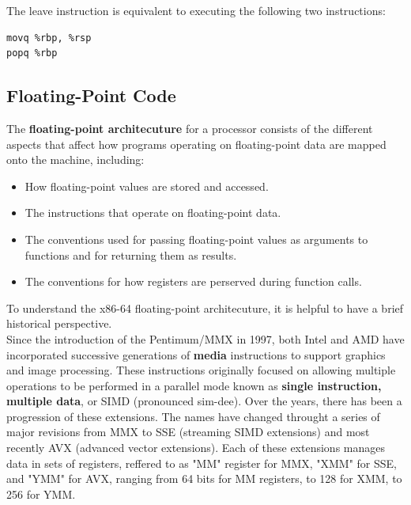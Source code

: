 \documentclass[11pt]{article}
\begin{document}
The leave instruction is equivalent to executing the following two instructions:\\
\begin{verbatim}
movq %rbp, %rsp
popq %rbp
\end{verbatim}

\subsection{Floating-Point Code}
\label{sec:org8b856b1}
The \textbf{floating-point architecuture} for a processor consists of the different aspects that affect how programs operating on floating-point data are mapped onto the machine, including:\\
\begin{itemize}
\item How floating-point values are stored and accessed.\\
\item The instructions that operate on floating-point data.\\
\item The conventions used for passing floating-point values as arguments to functions and for returning them as results.\\
\item The conventions for how registers are perserved during function calls.\\
\end{itemize}

To understand the x86-64 floating-point architecuture, it is helpful to have a brief historical perspective.\\

Since the introduction of the Pentimum/MMX in 1997, both Intel and AMD have incorporated successive generations of \textbf{media} instructions to support graphics and image processing. These instructions originally focused on allowing multiple operations to be performed in a parallel mode known as \textbf{single instruction, multiple data}, or SIMD (pronounced sim-dee). Over the years, there has been a progression of these extensions. The names have changed throught a series of major revisions from MMX to SSE (streaming SIMD extensions) and most recently AVX (advanced vector extensions). Each of these extensions manages data in sets of registers, reffered to as "MM" register for MMX, "XMM" for SSE, and "YMM" for AVX, ranging from 64 bits for MM registers, to 128 for XMM, to 256 for YMM.\\
\end{document}

